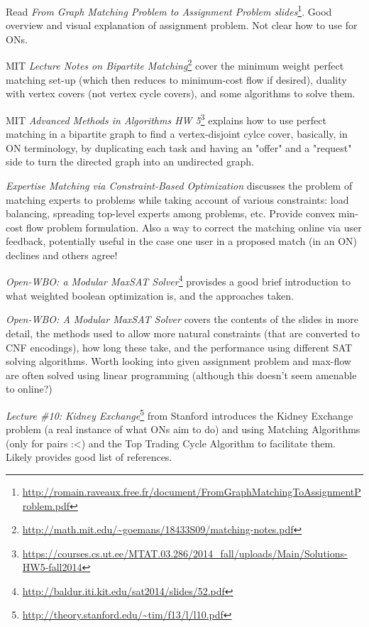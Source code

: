 \documentclass[
11pt, %
a4paper, %
oneside, %
headinclude,footinclude, %
BCOR5mm, %
]{scrartcl}
\begin{document}
Read \textit{From Graph Matching Problem to Assignment Problem slides}\footnote{ \url{http://romain.raveaux.free.fr/document/FromGraphMatchingToAssignmentProblem.pdf}}. Good overview and visual explanation of assignment problem. Not clear how to use for ONs.

MIT \textit{Lecture Notes on Bipartite Matching}\footnote{\url{http://math.mit.edu/~goemans/18433S09/matching-notes.pdf}} cover the minimum weight perfect matching set-up (which then reduces to minimum-cost flow if desired), duality with vertex covers (not vertex cycle covers), and some algorithms to solve them.

MIT \textit{Advanced Methods in Algorithms HW 5}\footnote{\url{https://courses.cs.ut.ee/MTAT.03.286/2014_fall/uploads/Main/Solutions-HW5-fall2014}} explains how to use perfect matching in a bipartite graph to find a vertex-disjoint cylce cover, basically, in ON terminology, by duplicating each task and having an "offer" and a "request" side to turn the directed graph into an undirected graph.

\textit{Expertise Matching via Constraint-Based Optimization} \cite{Tan1} discusses the problem of matching experts to problems while taking account of various constraints: load balancing, spreading top-level experts among problems, etc. Provide convex min-cost flow problem formulation. Also a way to correct the matching online via user feedback, potentially useful in the case one user in a proposed match (in an ON) declines and others agree!

\textit{Open-WBO: a Modular MaxSAT Solver}\footnote{\url{http://baldur.iti.kit.edu/sat2014/slides/52.pdf}} provisdes a good brief introduction to what weighted boolean optimization is, and the approaches taken.

\textit{Open-WBO: A Modular MaxSAT Solver} \cite{Mar1} covers the contents of the slides in more detail, the methods used to allow more natural constraints (that are converted to CNF encodings), how long these take, and the performance using different SAT solving algorithms. Worth looking into given assignment problem and max-flow are often solved using linear programming (although this doesn't seem amenable to online?)

\textit{Lecture \#10: Kidney Exchange}\footnote{\url{http://theory.stanford.edu/~tim/f13/l/l10.pdf}} from Stanford introduces the Kidney Exchange problem (a real instance of what ONs aim to do) and using Matching Algorithms (only for pairs :<) and the Top Trading Cycle Algorithm to facilitate them. Likely provides good list of references.
\end{document}
